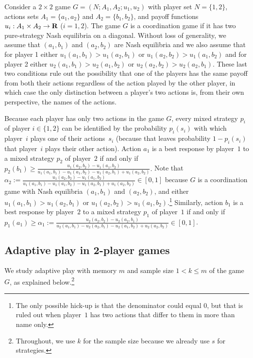 \documentclass[11.5pt]{article}
\begin{document}
Consider a $2\times 2$ game $G=(N;A_1,A_2;u_1, u_2)$ with player set $N=\{1,2\}$, actions sets $A_1=\{a_1,a_2\}$ and $A_2=\{b_1,b_2\}$, and payoff functions $u_i: A_1\times A_2 \rightarrow \bf{R}$ ($i=1,2$). The game $G$ is a coordination game if it has two pure-strategy Nash equilibria on a diagonal. Without loss of generality, we assume that $(a_1,b_1)$ and $(a_2,b_2)$ are Nash equilibria and we also assume that for player 1 either $u_1(a_1,b_1) > u_1(a_2,b_1)$ or $u_1(a_2,b_2) > u_1(a_1,b_2)$ and for player 2 either $u_2(a_1,b_1) > u_2(a_1,b_2)$ or $u_2(a_2,b_2) > u_2(a_2,b_1)$. These last two conditions rule out the possibility that one of the players has the same payoff from both their actions regardless of the action played by the other player, in which case the only distinction between a player's two actions is, from their own perspective, the names of the actions. %

Because each player has only two actions in the game $G$, every mixed strategy $p_i$ of player $i\in \{1,2\}$ can be identified by the probability $p_i(s_i)$ with which player~$i$ plays one of their actions~$s_i$ (because that leaves probability $1-p_i(s_i)$ that player~$i$ plays their other action). 
%
Action $a_1$ is a best response by player~$1$ to a mixed strategy $p_2$ of player~$2$ if and only if 
$p_2(b_1) \geq \frac{u_1(a_2,b_2)-u_1(a_1,b_2)}{u_1(a_1,b_1)-u_1(a_1,b_2)-u_1(a_2,b_1)+u_1(a_2,b_2)}.$ Note that $\alpha_2 :=\frac{u_1(a_2,b_2)-u_1(a_1,b_2)}{u_1(a_1,b_1)-u_1(a_1,b_2)-u_1(a_2,b_1)+u_1(a_2,b_2)}\in [0,1]$ because $G$ is a coordination game with Nash equilibria $(a_1,b_1)$ and $(a_2,b_2)$, and either $u_1(a_1,b_1) > u_1(a_2,b_1)$ or $u_1(a_2,b_2) > u_1(a_1,b_2)$.\footnote{The only possible hick-up is that the denominator could equal 0, but that is ruled out when player~$1$ has two actions that differ to them in more than name only.}
%
Similarly, action $b_1$ is a best response by player~$2$ to a mixed strategy $p_1$ of player~$1$ if and only if 
$p_1(a_1) \geq \alpha_1 := \frac{u_2(a_2,b_2)-u_2(a_2,b_1)}{u_2(a_1,b_1)-u_2(a_2,b_1)-u_2(a_1,b_2)+u_2(a_2,b_2)} \in [0,1]$.


\subsection{Adaptive play in 2-player games}
 
We study adaptive play \citep{young1993evolution} with memory $m$ and sample size $1<k\leq m$ of the game~$G$, as explained below.\footnote{Throughout, we use $k$ for the sample size because we already use $s$ for strategies.} 
\end{document}
